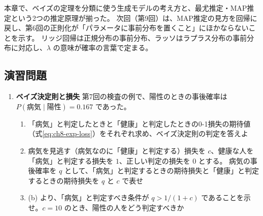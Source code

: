 本章で、ベイズの定理を分類に使う生成モデルの考え方と、最尤推定・MAP推定という2つの推定原理が揃った。
次回（第9回）は、MAP推定の見方を回帰に戻し、第6回の正則化が「パラメータに事前分布を置くこと」にほかならないことを示す。
リッジ回帰は正規分布の事前分布、ラッソはラプラス分布の事前分布に対応し、$\lambda$ の意味が確率の言葉で定まる。


\subsection{演習問題}

\begin{enumerate}

  \item \textbf{ベイズ決定則と損失}\quad
    第7回の検査の例で、陽性のときの事後確率は $P(\text{病気} \mid \text{陽性}) = 0.167$ であった。
    \begin{enumerate}
      \item 「病気」と判定したときと「健康」と判定したときの0-1損失の期待値（式\eqref{eq:ch8-exp-loss}）をそれぞれ求め、ベイズ決定則の判定を答えよ
      \item 病気を見逃す（病気なのに「健康」と判定する）損失を $c$、健康な人を「病気」と判定する損失を $1$、正しい判定の損失を $0$ とする。
        病気の事後確率を $q$ として、「病気」と判定するときの期待損失と「健康」と判定するときの期待損失を $q$ と $c$ で表せ
      \item (b) より、「病気」と判定すべき条件が $q > 1/(1 + c)$ であることを示せ。$c = 10$ のとき、陽性の人をどう判定すべきか
    \end{enumerate}


\end{enumerate}
